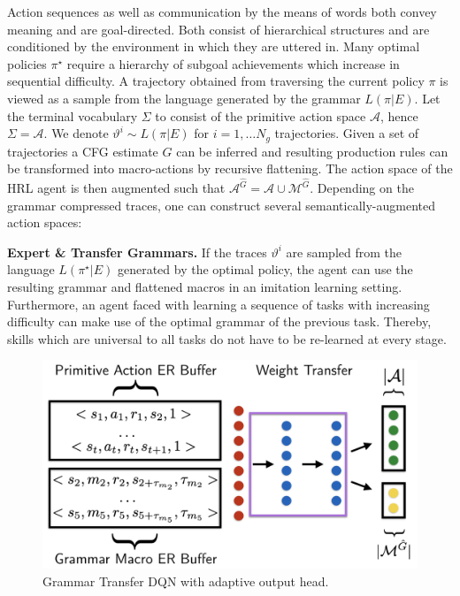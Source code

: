 \documentclass[10pt,letterpaper]{article}
\begin{document}
 Action sequences as well as communication by the means of words both convey meaning and are goal-directed. Both consist of hierarchical structures and are conditioned by the environment in which they are uttered in. 
Many optimal policies $\pi^\star$ require a hierarchy of subgoal achievements which increase in sequential difficulty.
A trajectory obtained from traversing the current policy $\pi$ is viewed as a sample from the language generated by the grammar $L(\pi|E)$. Let the terminal vocabulary $\Sigma$ to consist of the primitive action space $\mathcal{A}$, hence $\Sigma = \mathcal{A}$. We denote  $\vartheta^i \sim L(\pi|E)$ for $i = 1, \dots N_g$ trajectories. Given a set of trajectories a CFG estimate $\hat{G}$ can be inferred and resulting production rules can be transformed into macro-actions by recursive flattening. The action space of the HRL agent is then augmented such that $\mathcal{A}^{\hat{G}} = \mathcal{A} \cup \mathcal{M}^{\hat{G}}$. Depending on the grammar compressed traces, one can construct several semantically-augmented action spaces:

\textbf{Expert \& Transfer Grammars.} If the traces $\vartheta^i$ are sampled from the language $L(\pi^\star|E)$ generated by the optimal policy, the agent can use the resulting grammar and flattened macros in an imitation learning setting. Furthermore, an agent faced with learning a sequence of tasks with increasing difficulty can make use of the optimal grammar of the previous task. Thereby, skills which are universal to all tasks do not have to be re-learned at every stage. 

  \begin{figure}
    \includegraphics[width=\linewidth]{figures/ag_dqn_buffer}
    \caption{Grammar Transfer DQN with adaptive output head.}
  \label{fig:online_ag_dqn}
  \end{figure}
  
\end{document}
